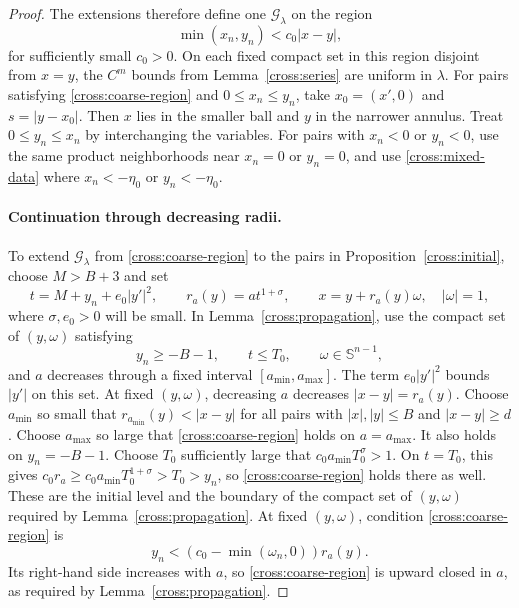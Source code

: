 \documentclass[11pt,a4paper]{article}
\theoremstyle{definition}
\theoremstyle{remark}
\numberwithin{equation}{section}
\begin{document}
\begin{proof}
The extensions therefore define one $\mathcal G_\lambda$ on the region
\begin{equation}\label{cross:coarse-region}
 \min(x_n,y_n)<c_0|x-y|,
\end{equation}
for sufficiently small $c_0>0$. On each fixed compact set in this region
disjoint from $x=y$, the $C^m$ bounds from Lemma~\ref{cross:series}
are uniform in $\lambda$.
For pairs satisfying \eqref{cross:coarse-region} and $0\le x_n\le y_n$, take
$x_0=(x',0)$ and $s=|y-x_0|$.
Then $x$ lies in the smaller ball and $y$ in the narrower annulus.
Treat $0\le y_n\le x_n$ by interchanging the variables.
For pairs with $x_n<0$ or $y_n<0$, use the same product neighborhoods
near $x_n=0$ or $y_n=0$, and use \eqref{cross:mixed-data} where
$x_n<-\eta_0$ or $y_n<-\eta_0$.

\paragraph{Continuation through decreasing radii.}
To extend $\mathcal G_\lambda$ from \eqref{cross:coarse-region}
to the pairs in Proposition~\ref{cross:initial}, choose $M>B+3$ and set
\begin{equation}\label{cross:tubes}
 t=M+y_n+e_0|y'|^2,\qquad r_a(y)=a t^{1+\sigma},\qquad
 x=y+r_a(y)\omega,\quad |\omega|=1,
\end{equation}
where $\sigma,e_0>0$ will be small. In Lemma~\ref{cross:propagation},
use the compact set of $(y,\omega)$ satisfying
\[
 y_n\ge-B-1,\qquad t\le T_0,\qquad \omega\in\mathbb S^{n-1},
\]
and $a$ decreases through a fixed interval $[a_{\min},a_{\max}]$.
The term $e_0|y'|^2$ bounds $|y'|$ on this set. At fixed $(y,\omega)$,
decreasing $a$ decreases $|x-y|=r_a(y)$.
Choose $a_{\min}$ so small that
$r_{a_{\min}}(y)<|x-y|$ for all pairs with
$|x|,|y|\le B$ and $|x-y|\ge d$.
Choose $a_{\max}$ so large that \eqref{cross:coarse-region} holds on
$a=a_{\max}$. It also holds on $y_n=-B-1$. Choose $T_0$ sufficiently
large that $c_0a_{\min}T_0^\sigma>1$. On $t=T_0$, this gives
$c_0r_a\ge c_0a_{\min}T_0^{1+\sigma}>T_0>y_n$, so
\eqref{cross:coarse-region} holds there as well. These are the initial
level and the boundary of the compact set of $(y,\omega)$ required
by Lemma~\ref{cross:propagation}.
At fixed $(y,\omega)$, condition \eqref{cross:coarse-region} is
\[
 y_n<(c_0-\min(\omega_n,0))r_a(y).
\]
Its right-hand side increases with $a$, so \eqref{cross:coarse-region}
is upward closed in $a$, as required by Lemma~\ref{cross:propagation}.


\end{proof}
\end{document}
